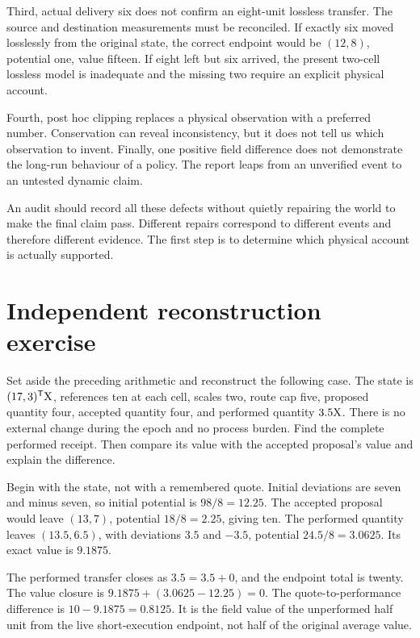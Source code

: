 Third, actual delivery six does not confirm an eight-unit lossless transfer. The source and destination measurements must be reconciled. If exactly six moved losslessly from the original state, the correct endpoint would be \((12,8)\), potential one, value fifteen. If eight left but six arrived, the present two-cell lossless model is inadequate and the missing two require an explicit physical account.

Fourth, post hoc clipping replaces a physical observation with a preferred number. Conservation can reveal inconsistency, but it does not tell us which observation to invent. Finally, one positive field difference does not demonstrate the long-run behaviour of a policy. The report leaps from an unverified event to an untested dynamic claim.

An audit should record all these defects without quietly repairing the world to make the final claim pass. Different repairs correspond to different events and therefore different evidence. The first step is to determine which physical account is actually supported.

\section{Independent reconstruction exercise}

Set aside the preceding arithmetic and reconstruct the following case. The state is \((17,3)^{\mathsf T}\mathrm{X}\), references ten at each cell, scales two, route cap five, proposed quantity four, accepted quantity four, and performed quantity \(3.5\mathrm{X}\). There is no external change during the epoch and no process burden. Find the complete performed receipt. Then compare its value with the accepted proposal's value and explain the difference.

Begin with the state, not with a remembered quote. Initial deviations are seven and minus seven, so initial potential is \(98/8=12.25\). The accepted proposal would leave \((13,7)\), potential \(18/8=2.25\), giving ten. The performed quantity leaves \((13.5,6.5)\), with deviations \(3.5\) and \(-3.5\), potential \(24.5/8=3.0625\). Its exact value is \(9.1875\).

The performed transfer closes as \(3.5=3.5+0\), and the endpoint total is twenty. The value closure is \(9.1875+(3.0625-12.25)=0\). The quote-to-performance difference is \(10-9.1875=0.8125\). It is the field value of the unperformed half unit from the live short-execution endpoint, not half of the original average value.

